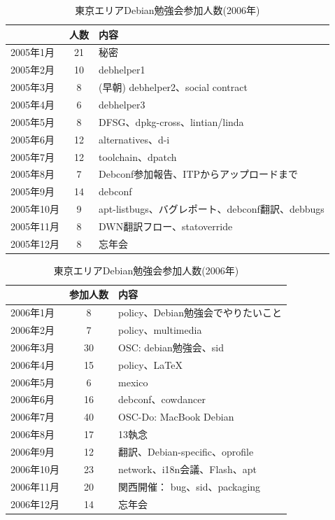 \documentclass[mingoth,a4paper]{jsarticle}
\begin{document}
\begin{commandline}
\begin{table}[ht]
\begin{minipage}{0.5\hsize}
 \caption{東京エリアDebian勉強会参加人数(2005年)}\label{tab:count-1}
 \begin{center}
  \begin{tabular}{|l|c|p{10em}|}
 \hline
   & 人数 & 内容 \\
 \hline
   2005年1月 & 21 & 秘密\\
   2005年2月 & 10 & debhelper1\\
   2005年3月 & 8 &  (早朝) debhelper2、social contract\\
   2005年4月 & 6 & debhelper3\\
   2005年5月 & 8 & DFSG、dpkg-cross、lintian/linda\\
   2005年6月 & 12 & alternatives、d-i\\
   2005年7月 & 12 & toolchain、dpatch\\
   2005年8月 & 7 & Debconf参加報告、ITPからアップロードまで\\
   2005年9月 & 14 & debconf\\
   2005年10月 & 9 & apt-listbugs、バグレポート、debconf翻訳、debbugs\\
   2005年11月 & 8 & DWN翻訳フロー、statoverride\\
   2005年12月 & 8 & 忘年会\\
 \hline
  \end{tabular}
 \end{center}
\end{minipage}
\begin{minipage}{0.5\hsize}
 \caption{東京エリアDebian勉強会参加人数(2006年)}\label{tab:count2006-1}
 \begin{center}
  \begin{tabular}{|l|c|p{10em}|}
 \hline
 & 参加人数 & 内容\\
 \hline
 2006年1月 & 8 & policy、Debian勉強会でやりたいこと\\
 2006年2月 & 7 & policy、multimedia \\
 2006年3月 & 30 & OSC: debian勉強会、sid \\
 2006年4月 & 15 & policy、\LaTeX{} \\
 2006年5月 & 6 & mexico \\
 2006年6月 & 16 & debconf、cowdancer\\
 2006年7月 & 40 & OSC-Do: MacBook Debian \\
 2006年8月 & 17 & 13執念 \\
 2006年9月 & 12 & 翻訳、Debian-specific、oprofile \\
 2006年10月 & 23 & network、i18n会議、Flash、apt \\
 2006年11月 & 20 & 関西開催： bug、sid、packaging \\
 2006年12月 & 14 & 忘年会 \\
 \hline
  \end{tabular}
 \end{center}
\end{minipage}
 \end{table}


\end{commandline}
\end{document}
